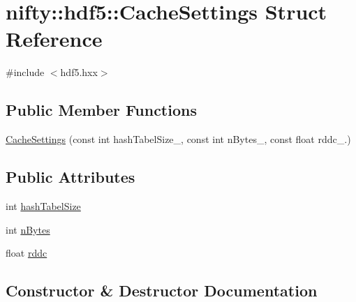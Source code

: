 \hypertarget{structnifty_1_1hdf5_1_1CacheSettings}{}\section{nifty\+:\+:hdf5\+:\+:Cache\+Settings Struct Reference}
\label{structnifty_1_1hdf5_1_1CacheSettings}


{\ttfamily \#include $<$hdf5.\+hxx$>$}

\subsection*{Public Member Functions}
\begin{DoxyCompactItemize}
\item 
\hyperlink{structnifty_1_1hdf5_1_1CacheSettings_aec0f428279a22300e530e134fa2b3947}{Cache\+Settings} (const int hash\+Tabel\+Size\+\_, const int n\+Bytes\+\_, const float rddc\+\_.)
\end{DoxyCompactItemize}
\subsection*{Public Attributes}
\begin{DoxyCompactItemize}
\item 
int \hyperlink{structnifty_1_1hdf5_1_1CacheSettings_ae99c704f44afa6ac669943633d859670}{hash\+Tabel\+Size}
\item 
int \hyperlink{structnifty_1_1hdf5_1_1CacheSettings_a95ec4250fd35413350f8a0bdbb78beed}{n\+Bytes}
\item 
float \hyperlink{structnifty_1_1hdf5_1_1CacheSettings_abdcd0cbeacf12d8fa7ea533213e4366a}{rddc}
\end{DoxyCompactItemize}


\subsection{Constructor \& Destructor Documentation}
\hypertarget{structnifty_1_1hdf5_1_1CacheSettings_aec0f428279a22300e530e134fa2b3947}{}
